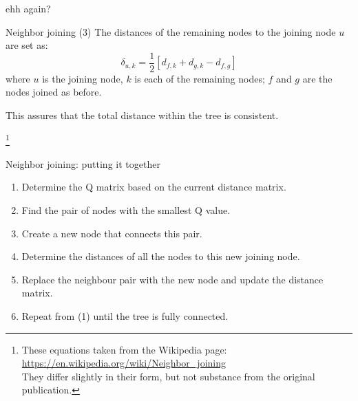 \documentclass[pdf]{beamer}
\newcommand\blfootnote[1]{%
  \begingroup  %
  \renewcommand\thefootnote{}\footnote{#1}%
  \addtocounter{footnote}{-1}  %
  \endgroup
}
\begin{document}
{\begin{frame}{ ehh again? }
\end{frame}

\begin{frame}{Neighbor joining (3)}
  The distances of the remaining nodes to the joining node $u$ are set as:
  $$
  \delta_{u,k} = \frac{1}{2}[d_{f,k} + d_{g,k} - d_{f,g}]
  $$
  where $u$ is the joining node, $k$ is each of the remaining nodes; $f$ and
  $g$ are the nodes joined as before.

  This assures that the total distance within the tree is consistent.

  \blfootnote{These equations taken from the Wikipedia page:\\
    \url{https://en.wikipedia.org/wiki/Neighbor_joining}\\
    They differ slightly in their form, but not substance from the original publication.}
\end{frame}

\begin{frame}{Neighbor joining: putting it together}
  \begin{enumerate}
  \item Determine the Q matrix based on the current distance matrix.
  \item Find the pair of nodes with the smallest Q value.
  \item Create a new node that connects this pair.
  \item Determine the distances of all the nodes to this new joining node.
  \item Replace the neighbour pair with the new node and update the distance
    matrix.
  \item Repeat from (1) until the tree is fully connected.
  \end{enumerate}
  
\end{frame}

}
\end{document}
